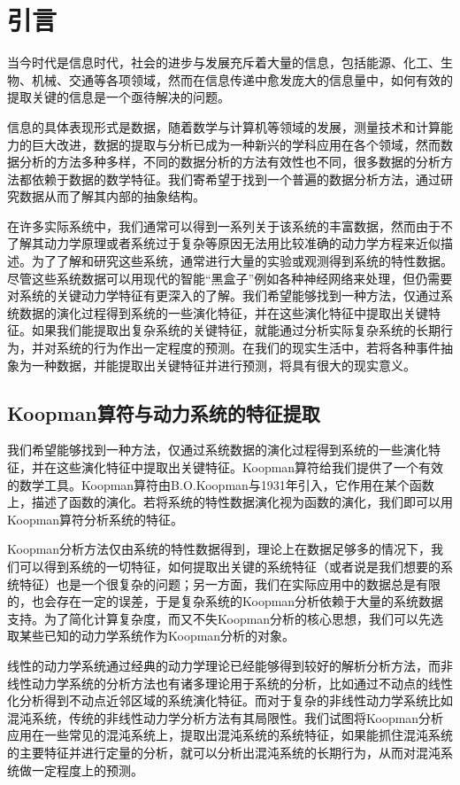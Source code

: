 \chapter{引言}

当今时代是信息时代，社会的进步与发展充斥着大量的信息，包括能源、化工、生物、机械、交通等各项领域，然而在信息传递中愈发庞大的信息量中，如何有效的提取关键的信息是一个亟待解决的问题。

信息的具体表现形式是数据，随着数学与计算机等领域的发展，测量技术和计算能力的巨大改进，数据的提取与分析已成为一种新兴的学科应用在各个领域，然而数据分析的方法多种多样，不同的数据分析的方法有效性也不同，很多数据的分析方法都依赖于数据的数学特征。我们寄希望于找到一个普遍的数据分析方法，通过研究数据从而了解其内部的抽象结构。

在许多实际系统中，我们通常可以得到一系列关于该系统的丰富数据，然而由于不了解其动力学原理或者系统过于复杂等原因无法用比较准确的动力学方程来近似描述。为了了解和研究这些系统，通常进行大量的实验或观测得到系统的特性数据。尽管这些系统数据可以用现代的智能“黑盒子”例如各种神经网络\cite{hassoun1995fundamentals}来处理，但仍需要对系统的关键动力学特征有更深入的了解。我们希望能够找到一种方法，仅通过系统数据的演化过程得到系统的一些演化特征，并在这些演化特征中提取出关键特征。如果我们能提取出复杂系统的关键特征，就能通过分析实际复杂系统的长期行为，并对系统的行为作出一定程度的预测。在我们的现实生活中，若将各种事件抽象为一种数据，并能提取出关键特征并进行预测，将具有很大的现实意义。

\section{Koopman算符与动力系统的特征提取}

我们希望能够找到一种方法，仅通过系统数据的演化过程得到系统的一些演化特征，并在这些演化特征中提取出关键特征。Koopman算符给我们提供了一个有效的数学工具。Koopman算符由B.O.Koopman与1931年引入\cite{koopman1931hamiltonian}，它作用在某个函数上，描述了函数的演化。若将系统的特性数据演化视为函数的演化，我们即可以用Koopman算符分析系统的特征。

Koopman分析方法仅由系统的特性数据得到，理论上在数据足够多的情况下，我们可以得到系统的一切特征，如何提取出关键的系统特征（或者说是我们想要的系统特征）也是一个很复杂的问题；另一方面，我们在实际应用中的数据总是有限的，也会存在一定的误差，于是复杂系统的Koopman分析依赖于大量的系统数据支持。为了简化计算复杂度，而又不失Koopman分析的核心思想，我们可以先选取某些已知的动力学系统作为Koopman分析的对象。

线性的动力学系统通过经典的动力学理论已经能够得到较好的解析分析方法，而非线性动力学系统的分析方法也有诸多理论用于系统的分析\cite{strogatz2001nonlinear}，比如通过不动点的线性化分析得到不动点近邻区域的系统演化特征。而对于复杂的非线性动力学系统比如混沌系统，传统的非线性动力学分析方法有其局限性\cite{holmes1996coherent}。我们试图将Koopman分析应用在一些常见的混沌系统上，提取出混沌系统的系统特征，如果能抓住混沌系统的主要特征并进行定量的分析，就可以分析出混沌系统的长期行为，从而对混沌系统做一定程度上的预测。

